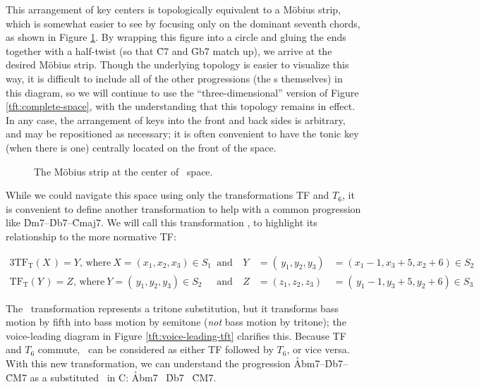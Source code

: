 This arrangement of key centers is topologically equivalent to a Möbius strip,
which is somewhat easier to see by focusing only on the dominant seventh
chords, as shown in Figure \ref{tft:mobius-dominants}. By wrapping this figure
into a circle and gluing the ends together with a half-twist (so that \h{C7}
and \h{Gb7} match up), we arrive at the desired Möbius strip. Though
the underlying topology is easier to visualize this way, it is difficult to
include all of the other progressions (the \tf{}s themselves) in this diagram,
so we will continue to use the ``three-dimensional'' version of Figure
\ref{tft:complete-space}, with the understanding that this topology remains in
effect. In any case, the arrangement of keys into the front and back sides is
arbitrary, and may be repositioned as necessary; it is often convenient to
have the tonic key (when there is one) centrally located on the front of the
space.

\begin{figure}[htbp]
  \caption{The Möbius strip at the center of \tf\ space.}
  \label{tft:mobius-dominants}
\end{figure}

While we could navigate this space using only the transformations TF and
$T_6$, it is convenient to define another transformation to help with a common
progression like \h{Dm7}--\h{Db7}--\h{Cmaj7}. We will call this
transformation \tft, to highlight its relationship to the more normative TF:

\vspace*{-3em} %
\begin{alignat*}{3}
    \mathrm{TF}_\mathrm{T}(X\,) = Y\text{, where}\ X = (x_1, x_2, x_3) \in S_1
    & \text{ and}\ &
    Y &= (\,y_1, y_2, y_3) &= (x_1 - 1, x_3 + 5, x_2 + 6) \in S_2 \\
    \mathrm{TF}_\mathrm{T}(Y\,) = Z\text{, where}\ Y = (\,y_1, y_2, y_3) \in S_2
    & \text{ and} &
    Z &= (z_1, z_2, z_3) &= (\,y_1 - 1, y_3 + 5, y_2 + 6) \in S_3
\end{alignat*}
\vspace{-3em}

\noindent The \tft\ transformation represents a tritone substitution, but it
transforms bass motion by fifth into bass motion by semitone (\emph{not} bass
motion by tritone); the voice-leading diagram in Figure
\ref{tft:voice-leading-tft} clarifies this. Because TF and $T_6$ commute,
\tft\ can be considered as either TF followed by $T_6$, or vice versa. With
this new transformation, we can understand the progression
\h{Abm7}--\h{Db7}--\h{CM7} as a substituted \tfo\ in C: \h{Abm7} \TFarrow\
\h{Db7} \TFTarrow\ \h{CM7}.


